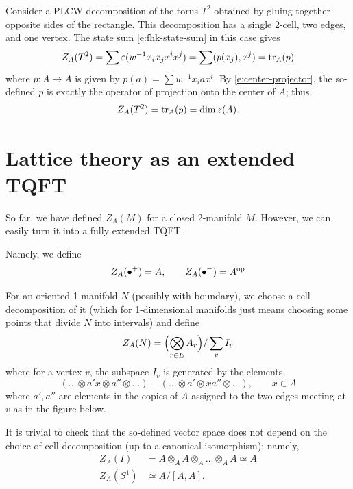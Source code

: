 \begin{example}\label{x:lattice-T2}
  Consider a PLCW decomposition of the torus $T^2$
  obtained by gluing together opposite sides of the rectangle. This
  decomposition has a single 2-cell, two edges, and one vertex.
  The state sum \eqref{e:fhk-state-sum} in this case gives
  $$
    Z_A(T^2)=\sum \varepsilon(w^{-1}x_ix_jx^ix^j)=\sum (p(x_j),x^j)=  \operatorname{tr}_A (p)
  $$
  where $p\colon A \to A$ is given by $p(a)=\sum w^{-1}x_iax^i$. By
  \eqref{e:center-projector}, the so-defined $p$ is exactly the operator of
  projection onto the center of $A$; thus,
  $$
   Z_A(T^2)= \operatorname{tr}_A (p)=\dim z(A).
  $$
\end{example}

\section{Lattice theory as an extended TQFT}\label{s:lattice-extended}
So far, we have defined $Z_A(M)$ for a closed 2-manifold $M$. However, we
can easily turn it into a fully extended TQFT.

Namely, we define
$$
Z_A(\bullet^+)=A, \qquad
Z_A(\bullet^-)=A^{\mathrm{op}}
$$

For an oriented 1-manifold $N$ (possibly with boundary), we choose a cell
decomposition of it (which for 1-dimensional manifolds just means choosing
some points that divide $N$ into intervals) and define
\begin{equation}\label{e:ZAN-def}
  Z_A(N) =\Bigl( \bigotimes_{r\in E} A_r\Bigr) /\sum_v I_v
\end{equation}
where for a vertex $v$, the subspace $I_v$ is generated by the elements
$$
  (\dots \otimes a' x\otimes a'' \otimes \dots)
- (\dots\otimes a'\otimes xa''\otimes \dots ), \qquad x\in A
$$
where $a', a''$ are elements in the copies of $A$ assigned to the two edges meeting at $v$ as in the figure below.

\begin{center}
\end{center}

It is trivial to check that the so-defined vector space does not depend on the
choice of cell decomposition (up to a canonical isomorphism); namely,
\begin{equation}\label{e:ZAI-ZAS1}
  \begin{aligned}
    Z_A(I)&=A\otimes_A A\otimes_A \dots \otimes_A A\simeq A\\
    Z_A(S^1)&\simeq A/[A,A].
  \end{aligned}
\end{equation}

